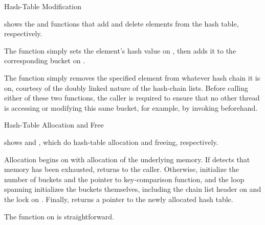 \QuickQuizEnd

\begin{listing}

\caption{Hash-Table Modification}
\label{lst:datastruct:Hash-Table Modification}
\end{listing}

shows the  and  functions
that add and delete elements from the hash table, respectively.

\begin{fcvref}
The  function simply sets the element's hash
value on , then adds it to the corresponding bucket on
.
\end{fcvref}
The  function simply removes the specified element
from whatever hash chain it is on, courtesy of the doubly linked
nature of the hash-chain lists.
Before calling either of these two functions, the caller is required to
ensure that no other thread is accessing
or modifying this same bucket, for example, by invoking
 beforehand.

\begin{listing}

\caption{Hash-Table Allocation and Free}
\label{lst:datastruct:Hash-Table Allocation and Free}
\end{listing}

shows  and ,
which do hash-table allocation and freeing, respectively.
\begin{fcvref}
Allocation begins on
 with allocation of the underlying memory.
If  detects that memory has been exhausted,
 returns
 to the caller.
Otherwise,  initialize
the number of buckets and the pointer to key-comparison function,
and the loop
spanning  initializes the buckets themselves,
including the chain list header on
 and the lock on .
Finally,  returns a pointer to the newly allocated hash table.
\end{fcvref}
\begin{fcvref}
The  function on
 is straightforward.
\end{fcvref}

